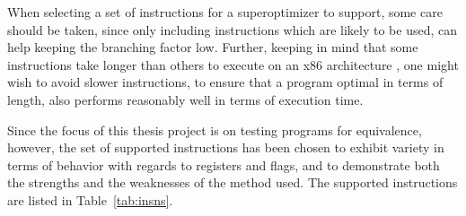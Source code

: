 \documentclass[a4paper,11pt]{kth-mag}
\begin{document}
When selecting a set of instructions for a superoptimizer to support, some care should be taken, since only including instructions which are likely to be used, can help keeping the branching factor low.
Further, keeping in mind that some instructions take longer than others to execute on an x86 architecture \cite{x86_timing}, one might wish to avoid slower instructions, to ensure that a program optimal in terms of length, also performs reasonably well in terms of execution time.

Since the focus of this thesis project is on testing programs for equivalence, however, the set of supported instructions has been chosen to exhibit variety in terms of behavior with regards to registers and flags, and to demonstrate both the strengths and the weaknesses of the method used. The supported instructions are listed in Table~\ref{tab:insns}.
\end{document}
